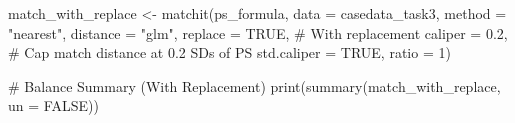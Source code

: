 \documentclass[
  letterpaper,
  DIV=11,
  numbers=noendperiod]{scrartcl}
\newenvironment{Shaded}{\begin{snugshade}}{\end{snugshade}}
\newcommand{\AttributeTok}[1]{\textcolor[rgb]{0.40,0.45,0.13}{#1}}
\newcommand{\CommentTok}[1]{\textcolor[rgb]{0.37,0.37,0.37}{#1}}
\newcommand{\ConstantTok}[1]{\textcolor[rgb]{0.56,0.35,0.01}{#1}}
\newcommand{\DecValTok}[1]{\textcolor[rgb]{0.68,0.00,0.00}{#1}}
\newcommand{\FloatTok}[1]{\textcolor[rgb]{0.68,0.00,0.00}{#1}}
\newcommand{\FunctionTok}[1]{\textcolor[rgb]{0.28,0.35,0.67}{#1}}
\newcommand{\NormalTok}[1]{\textcolor[rgb]{0.00,0.23,0.31}{#1}}
\newcommand{\OtherTok}[1]{\textcolor[rgb]{0.00,0.23,0.31}{#1}}
\newcommand{\StringTok}[1]{\textcolor[rgb]{0.13,0.47,0.30}{#1}}
\begin{document}
\begin{Shaded}
\begin{Highlighting}[]
\NormalTok{match\_with\_replace }\OtherTok{\textless{}{-}} \FunctionTok{matchit}\NormalTok{(ps\_formula,}
                              \AttributeTok{data =}\NormalTok{ casedata\_task3,}
                              \AttributeTok{method =} \StringTok{"nearest"}\NormalTok{,}
                              \AttributeTok{distance =} \StringTok{"glm"}\NormalTok{,}
                              \AttributeTok{replace =} \ConstantTok{TRUE}\NormalTok{,     }\CommentTok{\# With replacement}
                              \AttributeTok{caliper =} \FloatTok{0.2}\NormalTok{,      }\CommentTok{\# Cap match distance at 0.2 SDs of PS}
                              \AttributeTok{std.caliper =} \ConstantTok{TRUE}\NormalTok{,}
                              \AttributeTok{ratio =} \DecValTok{1}\NormalTok{)}

\CommentTok{\# Balance Summary (With Replacement)}
\FunctionTok{print}\NormalTok{(}\FunctionTok{summary}\NormalTok{(match\_with\_replace, }\AttributeTok{un =} \ConstantTok{FALSE}\NormalTok{))}
\end{Highlighting}
\end{Shaded}
\end{document}
